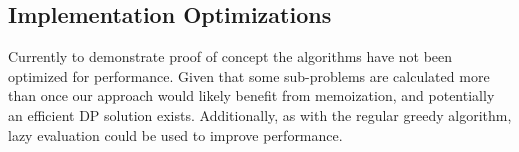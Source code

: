 \subsection{Implementation Optimizations}

Currently to demonstrate proof of concept the algorithms have not been optimized for performance. Given that some sub-problems are calculated more than once our approach would likely benefit from memoization, and potentially an efficient DP solution exists. Additionally, as with the regular greedy algorithm, lazy evaluation could be used to improve performance. 

  